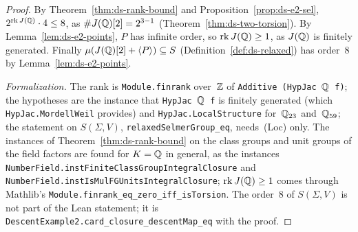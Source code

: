 \begin{proof}
\leanok
{}
By Theorem~\ref{thm:ds-rank-bound} and Proposition~\ref{prop:ds-e2-sel},
$2^{\operatorname{rk} J(\mathbb{Q})} \cdot 4 \le 8$, as $\#J(\mathbb{Q})[2] = 2^{3 - 1}$
(Theorem~\ref{thm:ds-two-torsion}). By Lemma~\ref{lem:ds-e2-points}, $P$ has infinite order, so
$\operatorname{rk} J(\mathbb{Q}) \ge 1$, as $J(\mathbb{Q})$ is finitely generated. Finally
$\mu(J(\mathbb{Q})[2] + \langle P\rangle) \subseteq S$ (Definition~\ref{def:ds-relaxed}) has order~$8$ by
Lemma~\ref{lem:ds-e2-points}.

\emph{Formalization.} The rank is \texttt{Module.finrank} over~$\mathbb{Z}$ of \texttt{Additive (HypJac
$\mathbb{Q}$ f)}; the hypotheses are the instance that \texttt{HypJac $\mathbb{Q}$ f} is finitely generated (which
\texttt{HypJac.MordellWeil} provides) and \texttt{HypJac.LocalStructure} for~$\mathbb{Q}_{23}$
and~$\mathbb{Q}_{59}$; the statement on $S(\Sigma, V)$, \texttt{relaxedSelmerGroup\_eq}, needs~(Loc) only.
The instances of Theorem~\ref{thm:ds-rank-bound} on the class groups and unit groups of the field
factors are found for $K = \mathbb{Q}$ in general, as the instances
\texttt{NumberField.instFiniteClassGroupIntegralClosure} and
\texttt{NumberField.instIsMulFGUnitsIntegralClosure}; $\operatorname{rk} J(\mathbb{Q}) \ge 1$ comes through
Mathlib's \texttt{Module.finrank\_eq\_zero\_iff\_isTorsion}. The order~$8$ of $S(\Sigma, V)$ is not
part of the Lean statement; it is \texttt{DescentExample2.card\_closure\_descentMap\_eq} with the
proof.
\end{proof}

